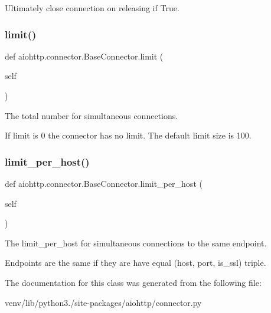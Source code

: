 \begin{DoxyVerb}Ultimately close connection on releasing if True.\end{DoxyVerb}
 \mbox{\label{classaiohttp_1_1connector_1_1_base_connector_a9ae454fca119e032ccf66cb4745f4fbe}} 
\subsubsection{\texorpdfstring{limit()}{limit()}}
{\footnotesize\ttfamily def aiohttp.\+connector.\+Base\+Connector.\+limit (\begin{DoxyParamCaption}\item[{}]{self }\end{DoxyParamCaption})}

\begin{DoxyVerb}The total number for simultaneous connections.

If limit is 0 the connector has no limit.
The default limit size is 100.
\end{DoxyVerb}
 \mbox{\label{classaiohttp_1_1connector_1_1_base_connector_adce24e0088f2017dcc7338b65a708f04}} 
\subsubsection{\texorpdfstring{limit\+\_\+per\+\_\+host()}{limit\_per\_host()}}
{\footnotesize\ttfamily def aiohttp.\+connector.\+Base\+Connector.\+limit\+\_\+per\+\_\+host (\begin{DoxyParamCaption}\item[{}]{self }\end{DoxyParamCaption})}

\begin{DoxyVerb}The limit_per_host for simultaneous connections
to the same endpoint.

Endpoints are the same if they are have equal
(host, port, is_ssl) triple.\end{DoxyVerb}
 

The documentation for this class was generated from the following file\+:\begin{DoxyCompactItemize}
\item 
venv/lib/python3./site-\/packages/aiohttp/connector.\+py\end{DoxyCompactItemize}
